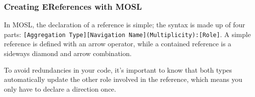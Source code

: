 \newpage
\subsubsection{Creating EReferences with MOSL}
\texHeader
\hypertarget{static:references tex}{}

In MOSL, the declaration of a reference is simple; the syntax is made up of four parts:  {\small{\texttt{[Aggregation Type][Navigation
Name](Multiplicity):[Role]}}}. A simple reference is defined with an arrow operator, while a contained reference is a sideways diamond and arrow combination.

To avoid redundancies in your code, it's important to know that both types automatically update the other role involved in the reference, which means you only
have to declare a direction once.


